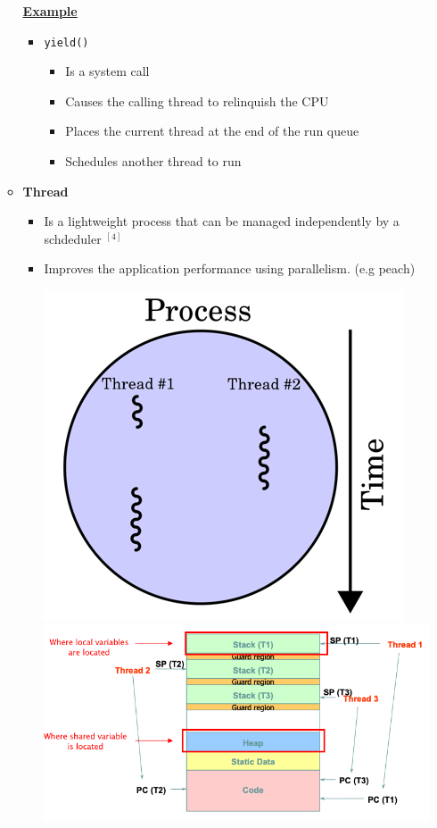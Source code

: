 \documentclass[12pt]{article}
\begin{document}
\begin{enumerate}[1.]
\begin{itemize}
        \underline{\textbf{Example}}

        \begin{itemize}
            \item \texttt{yield()}
            \begin{itemize}
                \item Is a system call
                \item Causes the calling thread to relinquish the CPU
                \item Places the current thread at the end of the run queue
                \item Schedules another thread to run
            \end{itemize}
        \end{itemize}

        \item \textbf{Thread}

        \begin{itemize}
            \item Is a lightweight process that can be managed independently by a schdeduler $^{[4]}$
            \item Improves the application performance using parallelism. (e.g peach)

            \begin{center}
            \includegraphics[width=0.4\linewidth]{images/midterm_2_solution_1.png}
            \includegraphics[width=\linewidth]{images/midterm_2_solution_2.png}
            \end{center}


\end{itemize}
\end{itemize}
\end{enumerate}
\end{document}
